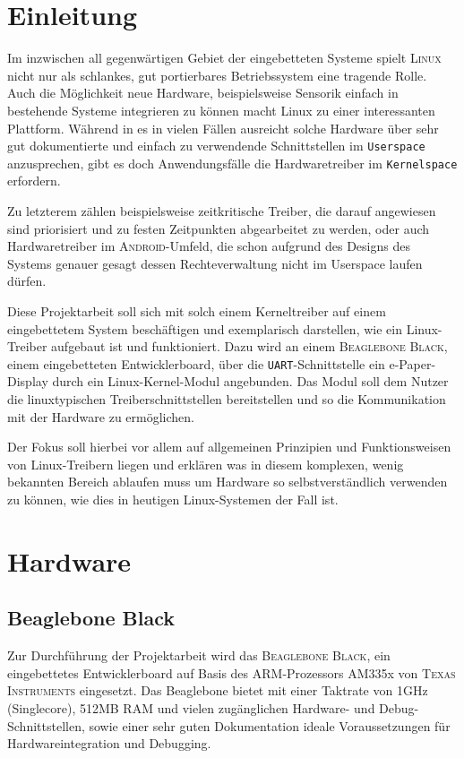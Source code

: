 
\chapter{Einleitung}
Im inzwischen all gegenwärtigen Gebiet der eingebetteten Systeme spielt \textsc{Linux} nicht nur als schlankes, gut portierbares Betriebssystem eine tragende Rolle. Auch die Möglichkeit neue Hardware, beispielsweise Sensorik einfach in bestehende Systeme integrieren zu können macht Linux zu einer interessanten Plattform. 
Während in es in vielen Fällen ausreicht solche Hardware über sehr gut dokumentierte und einfach zu verwendende Schnittstellen im \texttt{Userspace} anzusprechen, gibt es doch Anwendungsfälle die Hardwaretreiber im \texttt{Kernelspace} erfordern. 

Zu letzterem zählen beispielsweise zeitkritische Treiber, die darauf angewiesen sind priorisiert und zu festen Zeitpunkten abgearbeitet zu werden, oder auch Hardwaretreiber im \textsc{Android}-Umfeld, die schon aufgrund des Designs des Systems genauer gesagt dessen Rechteverwaltung nicht im Userspace laufen dürfen. \newline

Diese Projektarbeit soll sich mit solch einem Kerneltreiber auf einem eingebettetem System beschäftigen und exemplarisch darstellen, wie ein Linux-Treiber aufgebaut ist und funktioniert. Dazu wird an einem \textsc{Beaglebone Black}, einem eingebetteten Entwicklerboard, über die \texttt{UART}-Schnittstelle ein e-Paper-Display durch ein Linux-Kernel-Modul angebunden. Das Modul soll dem Nutzer die linuxtypischen Treiberschnittstellen bereitstellen und so die Kommunikation mit der Hardware zu ermöglichen.

Der Fokus soll hierbei vor allem auf allgemeinen Prinzipien und Funktionsweisen von Linux-Treibern liegen und erklären was in diesem komplexen, wenig bekannten Bereich ablaufen muss um Hardware so selbstverständlich verwenden zu können, wie dies in heutigen Linux-Systemen der Fall ist. 

\chapter{Hardware}

\section{Beaglebone Black}
Zur Durchführung der Projektarbeit wird das \textsc{Beaglebone Black}, ein eingebettetes Entwicklerboard auf Basis des ARM-Prozessors AM335x von \textsc{Texas Instruments} eingesetzt. Das Beaglebone bietet mit einer Taktrate von 1GHz (Singlecore), 512MB RAM und vielen zugänglichen Hardware- und Debug-Schnittstellen, sowie einer sehr guten Dokumentation ideale Voraussetzungen für Hardwareintegration und Debugging. 

